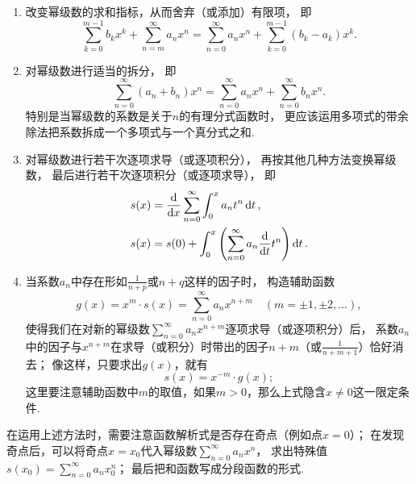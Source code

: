 \begin{enumerate}
\begin{enumerate}
		\item 改变幂级数的求和指标，从而舍弃（或添加）有限项，
		即\[
			\sum_{k=0}^{m-1} b_k x^k + \sum_{n=m}^\infty a_n x^n
			= \sum_{n=0}^\infty a_n x^n + \sum_{k=0}^{m-1} (b_k-a_k) x^k.
		\]

		\item 对幂级数进行适当的拆分，
		即\[
			\sum_{n=0}^\infty (a_n + b_n) x^n
			= \sum_{n=0}^\infty a_n x^n
			+ \sum_{n=0}^\infty b_n x^n.
		\]
		特别是当幂级数的系数是关于\(n\)的有理分式函数时，
		更应该运用多项式的带余除法把系数拆成一个多项式与一个真分式之和.

		\item 对幂级数进行若干次逐项求导（或逐项积分），
		再按其他几种方法变换幂级数，
		最后进行若干次逐项积分（或逐项求导），
		即\begin{align*}
			s(x) &= \dv{x} \sum_{n=0}^\infty \int_0^x a_n t^n \dd{t}, \\
			s(x) &= s(0) + \int_0^x \left(\sum_{n=0}^\infty a_n \dv{t} t^n\right) \dd{t}.
		\end{align*}

		\item 当系数\(a_n\)中存在形如\(\frac{1}{n+p}\)或\(n+q\)这样的因子时，
		构造辅助函数\[
			g(x) = x^m \cdot s(x) = \sum_{n=0}^\infty a_n x^{n+m}
			\quad(m=\pm1,\pm2,\dotsc),
		\]
		使得我们在对新的幂级数\(\sum_{n=0}^\infty a_n x^{n+m}\)逐项求导（或逐项积分）后，
		系数\(a_n\)中的因子与\(x^{n+m}\)在求导（或积分）时带出的因子\(n+m\)（或\(\frac{1}{n+m+1}\)）恰好消去；
		像这样，只要求出\(g(x)\)，就有\[
			s(x) = x^{-m} \cdot g(x);
		\]
		这里要注意辅助函数中\(m\)的取值，如果\(m>0\)，那么上式隐含\(x\neq0\)这一限定条件.
	\end{enumerate}
	在运用上述方法时，需要注意函数解析式是否存在奇点（例如点\(x=0\)）；
	在发现奇点后，可以将奇点\(x=x_0\)代入幂级数\(\sum_{n=0}^\infty a_n x^n\)，
	求出特殊值\(s(x_0) = \sum_{n=0}^\infty a_n x_0^n\)；
	最后把和函数写成分段函数的形式.
\end{enumerate}

